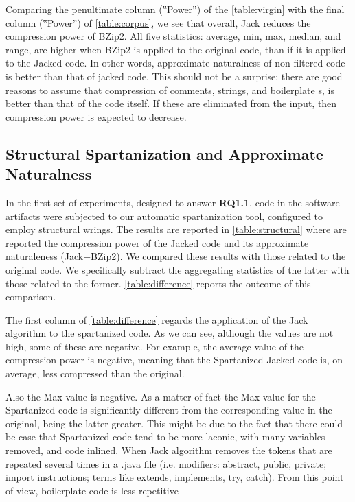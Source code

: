 Comparing the penultimate column (‟Power”) of the \cref{table:virgin}
with the final column (‟Power”) of
\cref{table:corpus}, we see that overall, Jack reduces the compression power of
BZip2. All five statistics: average, min, max, median, and range, are higher
when BZip2 is applied to the original code, than if it is applied to the Jacked
code. In other words, approximate naturalness of non-filtered code is better
than that of jacked code. This should not be a surprise: there are good reasons
to assume that compression of comments, strings, and boilerplate s,
is better than that of the code itself. If these are eliminated from the input,
then compression power is expected to decrease.

\subsection{Structural Spartanization and Approximate Naturalness}

In the first set of experiments, designed to answer \textbf{RQ1.1}, \Java code
in the software artifacts were subjected to our automatic spartanization
tool, configured to employ structural wrings.
The results are reported in \cref{table:structural} where are reported
the compression power of the Jacked code and its approximate
naturaleness (Jack+BZip2).
We compared these results %
with those related to the original code.
We specifically subtract the aggregating statistics of the latter with those related to the former.
\cref{table:difference} reports the outcome of this comparison.

The first column of \cref{table:difference} regards the application of the Jack
algorithm to the spartanized code. As we can see, although the values
are not high, some of these are negative.
For example, the average value of the compression power is negative,
meaning that the Spartanized Jacked code is, on average, less compressed than the original.

Also the Max value is negative. As a matter of fact the Max value for the Spartanized code is
significantly different from the corresponding value in the original, being the latter greater.
This might be due to the fact that there could be case that Spartanized code
tend to be more laconic, with many variables removed, and code inlined.
When Jack algorithm removes the tokens that are repeated several times in a .java file
(i.e. modifiers: abstract, public, private; import
instructions; terms like extends, implements, try, catch).
From this point of view, boilerplate code is less repetitive

